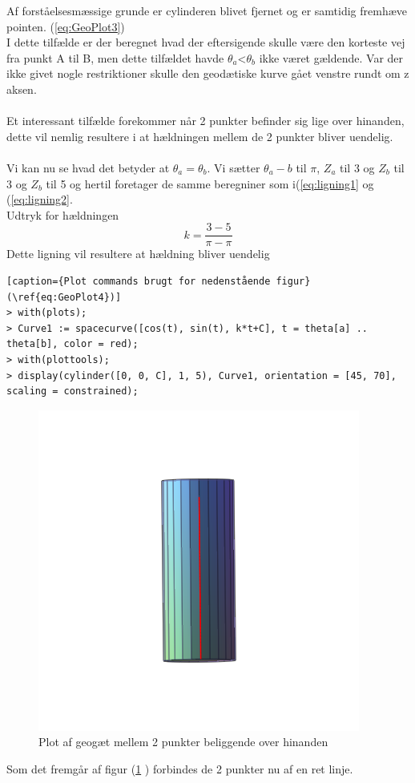 Af forståelsesmæssige grunde er cylinderen blivet fjernet og er samtidig fremhæve pointen. (\ref{eq:GeoPlot3})
\\
I dette tilfælde er der beregnet hvad der eftersigende skulle være den korteste vej fra punkt A til B, men dette tilfældet havde $\theta_a$<$\theta_b$ ikke været gældende. Var der ikke givet nogle restriktioner skulle den geodætiske kurve gået venstre rundt om z aksen.
\\
\\
Et interessant tilfælde forekommer når 2 punkter befinder sig lige over hinanden, dette vil nemlig resultere i at hældningen mellem de 2 punkter bliver uendelig.
\\
\\
Vi kan nu se hvad det betyder at $\theta_a=\theta_b$. Vi sætter $\theta_a-b$ til $\pi$, $Z_a$ til 3 og $Z_b$ til 3 og $Z_b$ til 5 og hertil foretager de samme beregniner som i(\ref{eq:ligning1} og (\ref{eq:ligning2}.
\\
Udtryk for hældningen
\begin{equation}
k=\frac{3-5}{\pi-\pi}
\end{equation}
Dette ligning vil resultere at hældning bliver uendelig
\begin{lstlisting}[caption={Plot commands brugt for nedenstående figur}(\ref{eq:GeoPlot4})] 
> with(plots);
> Curve1 := spacecurve([cos(t), sin(t), k*t+C], t = theta[a] .. theta[b], color = red);
> with(plottools);
> display(cylinder([0, 0, C], 1, 5), Curve1, orientation = [45, 70], scaling = constrained);
\end{lstlisting}
\begin{figure}
\center
\includegraphics[scale=0.4]{pictures/Opg8_Figur4.png}
\caption{Plot af geogæt mellem 2 punkter beliggende over hinanden}
\label{eq:GeoPlot4}
\end{figure}
Som det fremgår af figur (\ref{eq:GeoPlot4} ) forbindes de 2 punkter nu af en ret linje.

